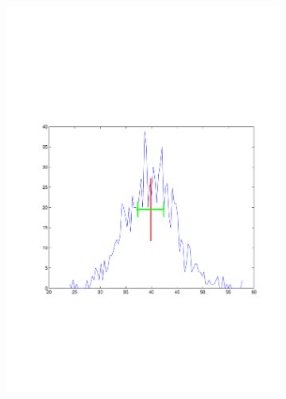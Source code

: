 \begin{figure}
\begin{subfigure}[c]{0.5\textwidth}
	\includegraphics[trim = 25mm 75mm 15mm 90mm, clip, width=\textwidth]{matlab/statfig_20}
\end{subfigure}
\begin{subfigure}[c]{0.5\textwidth}

\end{subfigure}
\end{figure}
